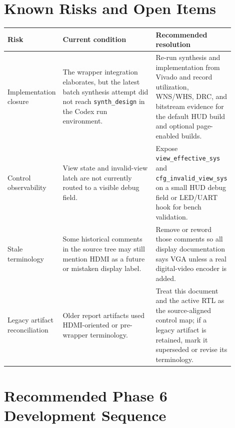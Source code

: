 \documentclass{article}
\newcommand{\sig}[1]{\begingroup\nolinkurl{#1}\endgroup}
\begin{document}
\section{Known Risks and Open Items}

\begin{longtable}{p{0.20\linewidth} p{0.42\linewidth} p{0.28\linewidth}}
\toprule
\textbf{Risk} & \textbf{Current condition} & \textbf{Recommended resolution} \\
\midrule
\endhead
Implementation closure &
The wrapper integration elaborates, but the latest batch synthesis attempt did
not reach \sig{synth_design} in the Codex run environment. &
Re-run synthesis and implementation from Vivado and record utilization, WNS/WHS,
DRC, and bitstream evidence for the default HUD build and optional page-enabled
builds. \\

Control observability &
View state and invalid-view latch are not currently routed to a visible debug
field. &
Expose \sig{view_effective_sys} and \sig{cfg_invalid_view_sys} on a small HUD
debug field or LED/UART hook for bench validation. \\

Stale terminology &
Some historical comments in the source tree may still mention HDMI as a future
or mistaken display label. &
Remove or reword those comments so all display documentation says VGA unless a
real digital-video encoder is added. \\

Legacy artifact reconciliation &
Older report artifacts used HDMI-oriented or pre-wrapper terminology. &
Treat this document and the active RTL as the source-aligned control map; if a
legacy artifact is retained, mark it superseded or revise its terminology. \\
\bottomrule
\end{longtable}

\section{Recommended Phase 6 Development Sequence}
\end{document}
